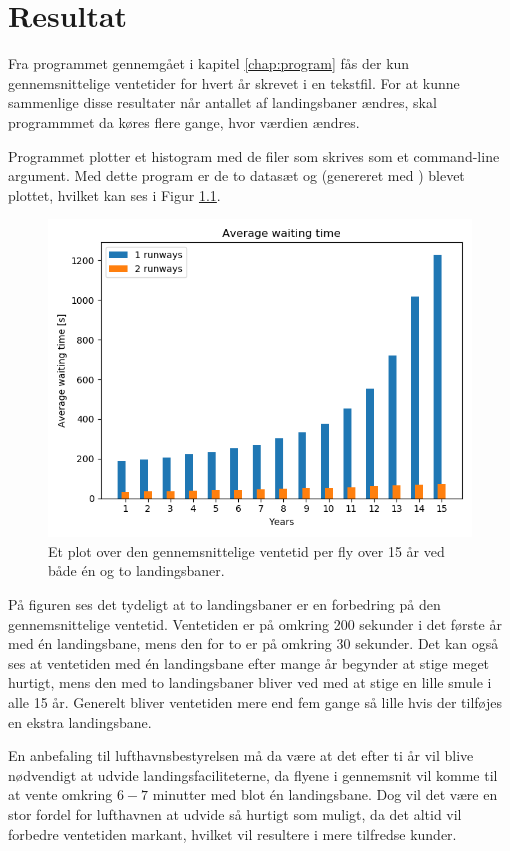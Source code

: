 \chapter{Resultat}
Fra programmet gennemgået i kapitel \ref{chap:program} fås der kun gennemsnittelige ventetider for hvert år skrevet i en tekstfil.
For at kunne sammenlige disse resultater når antallet af landingsbaner ændres, skal programmmet da køres flere gange, hvor værdien  ændres.

Programmet  plotter et histogram med de filer som skrives som et command-line argument.
Med dette program er de to datasæt  og  (genereret med ) blevet plottet, hvilket kan ses i Figur \ref{fig:results}.

\begin{figure}[h]
	\centering
	\includegraphics[scale=0.7]{fig/img/results_15Y.png}
	\caption{Et plot over den gennemsnittelige ventetid per fly over 15 år ved både én og to landingsbaner.} \label{fig:results}
\end{figure}

På figuren ses det tydeligt at to landingsbaner er en forbedring på den gennemsnittelige ventetid.
Ventetiden er på omkring 200 sekunder i det første år med én landingsbane, mens den for to er på omkring 30 sekunder.
Det kan også ses at ventetiden med én landingsbane efter mange år begynder at stige meget hurtigt, mens den med to landingsbaner bliver ved med at stige en lille smule i alle 15 år.
Generelt bliver ventetiden mere end fem gange så lille hvis der tilføjes en ekstra landingsbane.

En anbefaling til lufthavnsbestyrelsen må da være at det efter ti år vil blive nødvendigt at udvide landingsfaciliteterne, da flyene i gennemsnit vil komme til at vente omkring $6-7$ minutter med blot én landingsbane.
Dog vil det være en stor fordel for lufthavnen at udvide så hurtigt som muligt, da det altid vil forbedre ventetiden markant, hvilket vil resultere i mere tilfredse kunder.
